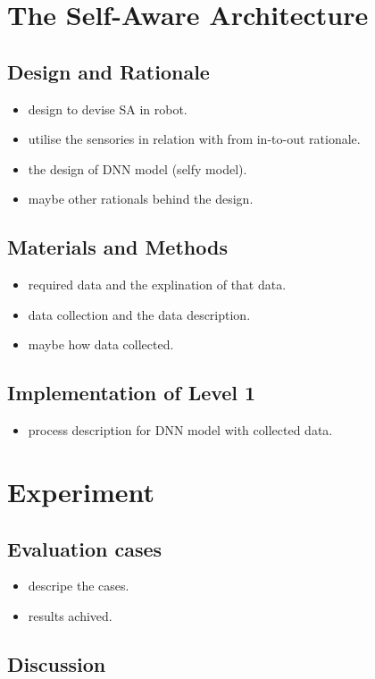 \documentclass[12pt]{article}
\begin{document}
\section{The Self-Aware Architecture}
\subsection{Design and Rationale}
\begin{itemize}
\item design to devise SA in robot.
\item utilise the sensories in relation with from in-to-out rationale.
\item the design of DNN model (selfy model). 
\item maybe other rationals behind the design.
\end{itemize}
\subsection{Materials and Methods}
\begin{itemize}
\item required data and the explination of that data.
\item data collection and the data description.
\item maybe how data collected.
\end{itemize}
\subsection{Implementation of Level 1}
\begin{itemize}
\item process description for DNN model with collected data.
\end{itemize}
\section{Experiment}
\subsection{Evaluation cases}
\begin{itemize}
\item descripe the cases.
\item results achived.
\end{itemize}
\subsection{Discussion}
\end{document}
